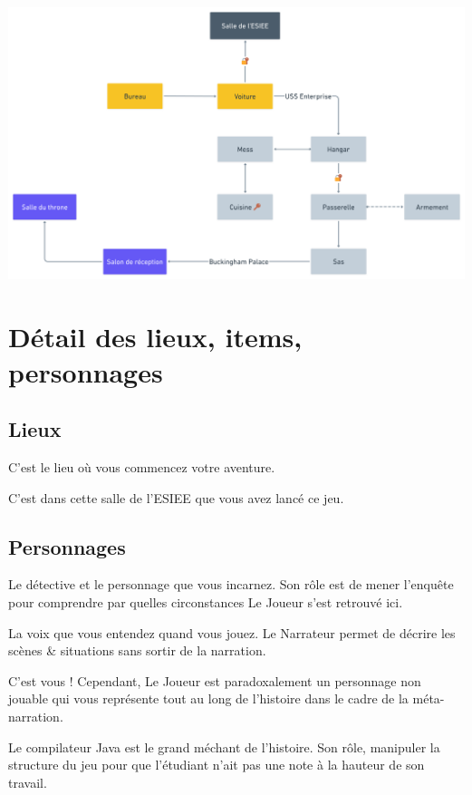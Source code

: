 \documentclass[a4paper,12pt]{report}
\begin{document}
\includegraphics[width=\textwidth,height=\textheight,keepaspectratio]{../media/map.png}\\

\section{Détail des lieux, items, personnages}

\subsection{Lieux}

\begin{description}[leftmargin=!,labelwidth=\widthof{\bfseries Bureau de Murphy}]
  \item [Bureau de Murphy] C'est le lieu où vous commencez votre aventure.
  \item [Salle de l'ESIEE] C'est dans cette salle de l'ESIEE que vous avez lancé ce jeu.
\end{description}

\subsection{Personnages}

\begin{description}[leftmargin=!,labelwidth=\widthof{\bfseries Le Compilateur}]
  \item [Murphy Law] Le détective et le personnage que vous incarnez. Son rôle est de mener l'enquête pour comprendre par quelles circonstances Le Joueur s'est retrouvé ici.
  \item [Le Narrateur] La voix que vous entendez quand vous jouez. Le Narrateur permet de décrire les scènes \& situations sans sortir de la narration. 
  \item [Le Joueur] C'est vous ! Cependant, Le Joueur est paradoxalement un personnage non jouable qui vous représente tout au long de  l'histoire dans le cadre de la méta-narration.
  \item [Le Compilateur] Le compilateur Java est le grand méchant de l'histoire. Son rôle, manipuler la structure du jeu pour que l'étudiant n'ait pas une note à la hauteur de son travail.
\end{description}
\end{document}
